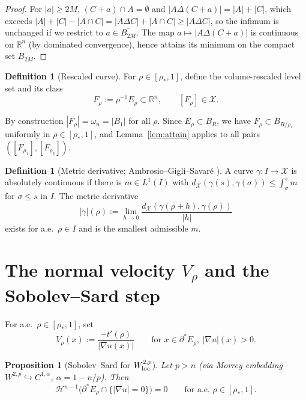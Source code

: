 \documentclass[11pt]{article}
\newtheorem{proposition}[theorem]{Proposition}
\theoremstyle{definition}
\newtheorem{definition}[theorem]{Definition}
\newcommand{\R}{\mathbb{R}}
\newcommand{\rstar}{\rho_{*}}
\newcommand{\X}{\mathcal X}
\begin{document}
\begin{proof}
For $|a|\ge 2M$, $(C+a)\cap A=\emptyset$ and $|A\Delta(C+a)|=|A|+|C|$, which
exceeds $|A|+|C|-|A\cap C|=|A\Delta C|+|A\cap C|\ge|A\Delta C|$, so the
infimum is unchanged if we restrict to $a\in\overline{B_{2M}}$. The map
$a\mapsto|A\Delta(C+a)|$ is continuous on $\R^n$ (by dominated convergence),
hence attains its minimum on the compact set $\overline{B_{2M}}$.
\end{proof}

\begin{definition}[Rescaled curve]\label{def:F}
For $\rho\in[\rstar,1]$, define the volume-rescaled level set and its class
\[
   F_\rho:=\rho^{-1}E_\rho\subset\R^n,\qquad [F_\rho]\in\X.
\]
\end{definition}

By construction $|F_\rho|=\omega_n=|B_1|$ for all $\rho$. Since
$E_\rho\subset B_R$, we have $F_\rho\subset B_{R/\rstar}$ uniformly in
$\rho\in[\rstar,1]$, and Lemma~\ref{lem:attain} applies to all pairs
$([F_{\rho_1}],[F_{\rho_2}])$.

\begin{definition}[Metric derivative; Ambrosio--Gigli--Savar\'e
{\cite[Thm.~1.1.2]{AGS2008}}]\label{def:AC}
A curve $\gamma:I\to\X$ is absolutely continuous if there is $m\in L^1(I)$
with $d_\X(\gamma(s),\gamma(\sigma))\le\int_\sigma^s m$ for
$\sigma\le s$ in $I$. The metric derivative
\[
   |\dot\gamma|(\rho):=\lim_{h\to 0}\frac{d_\X(\gamma(\rho+h),\gamma(\rho))}{|h|}
\]
exists for a.e.\ $\rho\in I$ and is the smallest admissible $m$.
\end{definition}

\section{The normal velocity $V_\rho$ and the Sobolev--Sard step}\label{sec:V}

For a.e.\ $\rho\in[\rstar,1]$, set
\begin{equation}\label{eq:V-def}
   V_\rho(x):=\frac{-t'(\rho)}{|\nabla u(x)|}\qquad
   \text{for }x\in\partial^*E_\rho,\ |\nabla u|(x)>0.
\end{equation}

\begin{proposition}[Sobolev--Sard for $W^{2,p}_{\rm loc}$]\label{prop:sard}
Let $p>n$ (via Morrey embedding $W^{2,p}\hookrightarrow C^{1,\alpha}$,
$\alpha=1-n/p$). Then
\begin{equation}\label{eq:sard}
   \mathcal H^{n-1}\bigl(\partial^*E_\rho\cap\{|\nabla u|=0\}\bigr)=0
   \qquad\text{for a.e.\ }\rho\in[\rstar,1].
\end{equation}
\end{proposition}
\end{document}
